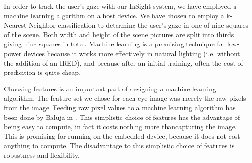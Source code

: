 In order to track the user's gaze with our InSight system, we have employed a machine learning algorithm on a host device.  We have chosen to employ a k-Nearest Neighbor classification to determine the user's gaze in one of nine squares of the scene.  Both width and height of the scene pictures are split into thirds giving nine squares in total.  Machine learning is a promising technique for low-power devices because it works more effectively in natural lighting (i.e. without the addition of an IRED), and because after an initial training, often the cost of predicition is quite cheap.

Choosing features is an important part of designing a machine learning algorithm.  The feature set we chose for each eye image was merely the raw pixels from the image.  Feeding raw pixel values to a machine learning algorithm has been done by Baluja in \cite{gaze-neural-net}.  This simplistic choice of features has the advantage of being easy to compute, in fact it costs nothing more thancapturing the image.    This is promising for running on the embedded device, because it does not cost anything to compute.  The disadvantage to this simplistic choice of features is robustness and flexibility.



